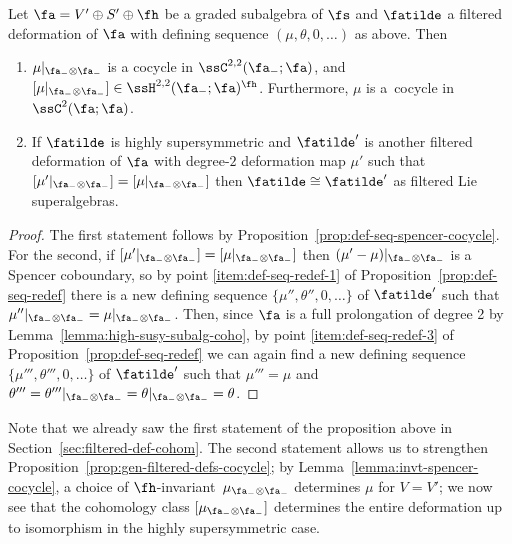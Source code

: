 \begin{Proposition}\label{prop:highly-susy-filtered-def}
	Let $\fa=V'\oplus S'\oplus\fh$ be a graded subalgebra of $\fs$ and $\fatilde$ a filtered deformation of $\fa$ with defining sequence $(\mu,\theta,0,\dots)$ as above. Then
	\begin{enumerate}\itemsep=0pt
		\item[$(1)$] $\mu|_{\fa_-\otimes\fa_-}$ is a cocycle in $\ssC^{2,2}(\fa_-;\fa)$, and
$[\mu|_{\fa_-\otimes\fa_-}] \in \ssH^{2,2}(\fa_-;\fa)^\fh$.
		Furthermore, $\mu$ is a~cocycle in $\ssC^2(\fa;\fa)$.	%
		\item[$(2)$] If $\fatilde$ is highly supersymmetric and $\fatilde'$ is another filtered deformation of $\fa$ with degree-$2$ deformation map $\mu'$ such that $[\mu'|_{\fa_-\otimes\fa_-}]=[\mu|_{\fa_-\otimes\fa_-}]$ then $\fatilde\cong\fatilde'$ as filtered Lie superalgebras.	%
	\end{enumerate}
\end{Proposition}

\begin{proof}
	The first statement follows by Proposition~\ref{prop:def-seq-spencer-cocycle}. For the second, if $[\mu'|_{\fa_-\otimes\fa_-}]=[\mu|_{\fa_-\otimes\fa_-}]$ then $(\mu'-\mu)|_{\fa_-\otimes\fa_-}$ is a Spencer coboundary, so by point \ref{item:def-seq-redef-1} of Proposition~\ref{prop:def-seq-redef} there is a new defining sequence $\{\mu'',\theta'',0,\dots\}$ of $\fatilde'$ such that $\mu''|_{\fa_-\otimes\fa_-}=\mu|_{\fa_-\otimes\fa_-}$. Then, since $\fa$ is a full prolongation of degree 2 by Lemma~\ref{lemma:high-susy-subalg-coho}, by point \ref{item:def-seq-redef-3} of Proposition~\ref{prop:def-seq-redef} we can again find a new defining sequence $\{\mu''',\theta''',0,\dots\}$ of $\fatilde'$ such that $\mu'''=\mu$ and $\theta'''=\theta'''|_{\fa_-\otimes\fa_-}=\theta|_{\fa_-\otimes\fa_-}=\theta$.
\end{proof}

Note that we already saw the first statement of the proposition above in Section~\ref{sec:filtered-def-cohom}. The second statement allows us to strengthen Proposition~\ref{prop:gen-filtered-defs-cocycle}; by Lemma~\ref{lemma:invt-spencer-cocycle}, a choice of $\fh$-invari\-ant~$\mu_{\fa_-\otimes\fa_-}$ determines $\mu$ for $V=V'$; we now see that the cohomology class $[\mu_{\fa_-\otimes\fa_-}]$ determines the entire deformation up to isomorphism in the highly supersymmetric case.

